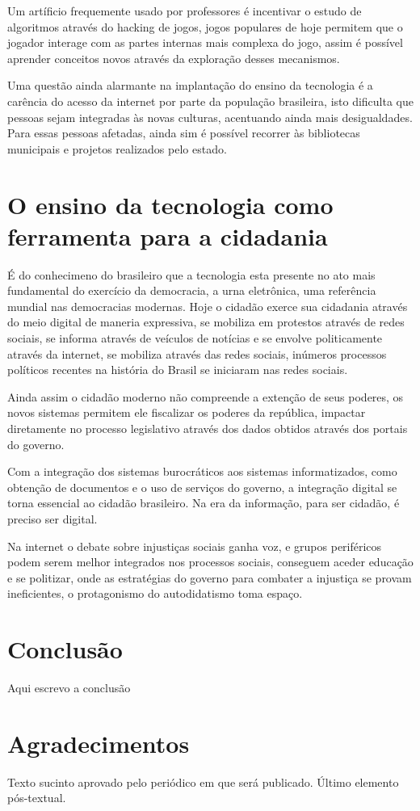 \documentclass[article, 11pt, oneside, a4paper, english, brazil, sumario=tradicional]{abntex2}
\begin{document}
    Um artíficio frequemente usado por professores é incentivar o estudo de
    algoritmos através do hacking de jogos, jogos populares de hoje permitem que
    o jogador interage com as partes internas mais complexa do jogo, assim é
    possível aprender conceitos novos através da exploração desses mecanismos.

    Uma questão ainda alarmante na implantação do ensino da tecnologia é a
    carência do acesso da internet por parte da população brasileira, isto
    dificulta que pessoas sejam integradas às novas culturas, acentuando ainda
    mais desigualdades. Para essas pessoas afetadas, ainda sim é possível
    recorrer às bibliotecas municipais e projetos realizados pelo estado.

\section{O ensino da tecnologia como ferramenta para a cidadania}

    É do conhecimeno do brasileiro que a tecnologia esta presente no
ato mais fundamental do exercício da democracia, a urna eletrônica, uma
referência mundial nas democracias modernas. Hoje o cidadão exerce sua cidadania
através do meio digital de maneria expressiva, se mobiliza em protestos através
de redes sociais, se informa através de veículos de notícias e se envolve
politicamente através da internet, se mobiliza através das redes sociais,
inúmeros processos políticos recentes na história do Brasil se iniciaram nas
redes sociais.

    Ainda assim o cidadão moderno não compreende a extenção de seus poderes, os
    novos sistemas permitem ele fiscalizar os poderes da república, impactar
    diretamente no processo legislativo através dos dados obtidos através dos
    portais do governo.

    Com a integração dos sistemas burocráticos aos sistemas informatizados, como
    obtenção de documentos
e o uso de serviços do governo, a integração digital se torna essencial ao
cidadão brasileiro. Na era da informação, para ser cidadão, é preciso ser
digital.

    Na internet o debate sobre injustiças sociais ganha voz, e grupos
    periféricos podem
serem melhor integrados nos processos sociais, conseguem aceder educação e se
politizar, onde
as estratégias do governo para combater a injustiça se provam ineficientes, o
protagonismo do autodidatismo
toma espaço.

\section{Conclusão}
Aqui escrevo a conclusão

\postextual


\section*{Agradecimentos}
Texto sucinto aprovado pelo periódico em que será publicado. Último
elemento pós-textual.


\end{document}
